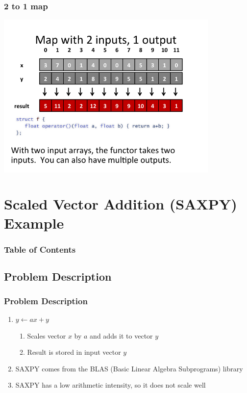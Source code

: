 \documentclass[xcolor=dvipsnames]{beamer}
\begin{document}
		\begin{frame} \frametitle{2 to 1 map}
		\includegraphics[width=110mm]{images/map2to1.png}
		\end{frame} 
		


\section{Scaled Vector Addition (SAXPY) Example} 

	\begin{frame} \frametitle{Table of Contents}
		\tableofcontents[currentsection]
	\end{frame} 
	
	\subsection{Problem Description}
		\begin{frame} \frametitle{Problem Description}
            \begin{enumerate}
                \item $y \leftarrow ax + y$
                    \begin{enumerate}
                        \item Scales vector $x$ by $a$ and adds it to vector 
                        $y$ 
                        \item Result is stored in input vector $y$
                    \end{enumerate}
                \item SAXPY comes from the BLAS (Basic Linear Algebra 
                Subprograms) library
                \item SAXPY has a low arithmetic intensity, so it does not 
                scale well
            \end{enumerate}
		\end{frame}
	
\end{document}
